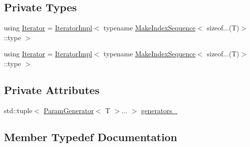 \subsection*{Private Types}
\begin{DoxyCompactItemize}
\item 
using \mbox{\hyperlink{classtesting_1_1internal_1_1_cartesian_product_generator_a01d41f7e7634ce6c4408af397f86bce3}{Iterator}} = \mbox{\hyperlink{classtesting_1_1internal_1_1_cartesian_product_generator_1_1_iterator_impl}{Iterator\+Impl}}$<$ typename \mbox{\hyperlink{structtesting_1_1internal_1_1_make_index_sequence}{Make\+Index\+Sequence}}$<$ sizeof...(T)$>$\+::type $>$
\item 
using \mbox{\hyperlink{classtesting_1_1internal_1_1_cartesian_product_generator_a01d41f7e7634ce6c4408af397f86bce3}{Iterator}} = \mbox{\hyperlink{classtesting_1_1internal_1_1_cartesian_product_generator_1_1_iterator_impl}{Iterator\+Impl}}$<$ typename \mbox{\hyperlink{structtesting_1_1internal_1_1_make_index_sequence}{Make\+Index\+Sequence}}$<$ sizeof...(T)$>$\+::type $>$
\end{DoxyCompactItemize}
\subsection*{Private Attributes}
\begin{DoxyCompactItemize}
\item 
std\+::tuple$<$ \mbox{\hyperlink{classtesting_1_1internal_1_1_param_generator}{Param\+Generator}}$<$ T $>$... $>$ \mbox{\hyperlink{classtesting_1_1internal_1_1_cartesian_product_generator_a6d66e88da1c3675e07d02985aa842f3a}{generators\+\_\+}}
\end{DoxyCompactItemize}


\subsection{Member Typedef Documentation}
\mbox{\label{classtesting_1_1internal_1_1_cartesian_product_generator_a01d41f7e7634ce6c4408af397f86bce3}} 
